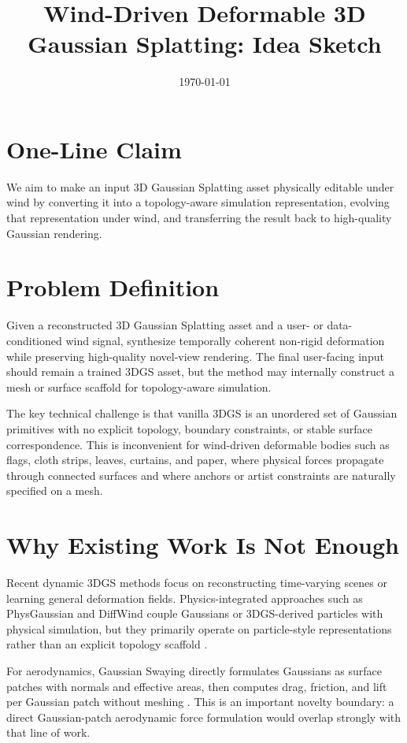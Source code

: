\documentclass[11pt]{article}
\title{Wind-Driven Deformable 3D Gaussian Splatting: Idea Sketch}
\author{}
\date{\today}
\begin{document}
\maketitle

\section{One-Line Claim}

We aim to make an input 3D Gaussian Splatting asset physically editable under wind by converting it into a topology-aware simulation representation, evolving that representation under wind, and transferring the result back to high-quality Gaussian rendering.

\section{Problem Definition}

Given a reconstructed 3D Gaussian Splatting asset and a user- or data-conditioned wind signal, synthesize temporally coherent non-rigid deformation while preserving high-quality novel-view rendering. The final user-facing input should remain a trained 3DGS asset, but the method may internally construct a mesh or surface scaffold for topology-aware simulation.

The key technical challenge is that vanilla 3DGS is an unordered set of Gaussian primitives with no explicit topology, boundary constraints, or stable surface correspondence. This is inconvenient for wind-driven deformable bodies such as flags, cloth strips, leaves, curtains, and paper, where physical forces propagate through connected surfaces and where anchors or artist constraints are naturally specified on a mesh.

\section{Why Existing Work Is Not Enough}

Recent dynamic 3DGS methods focus on reconstructing time-varying scenes or learning general deformation fields. Physics-integrated approaches such as PhysGaussian and DiffWind couple Gaussians or 3DGS-derived particles with physical simulation, but they primarily operate on particle-style representations rather than an explicit topology scaffold \cite{xie2024physgaussian,lei2026diffwind}.

For aerodynamics, Gaussian Swaying directly formulates Gaussians as surface patches with normals and effective areas, then computes drag, friction, and lift per Gaussian patch without meshing \cite{yan2025gaussianswaying}. This is an important novelty boundary: a direct Gaussian-patch aerodynamic force formulation would overlap strongly with that line of work.
\end{document}
